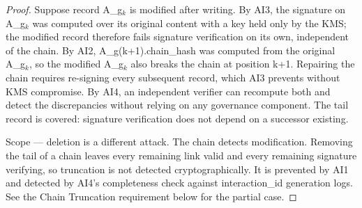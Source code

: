 \begin{proof}
Suppose record A\_\allowbreak{}g$_k$ is modified after writing.
By AI3, the signature on A\_\allowbreak{}g$_k$ was computed over its original content with a key held only by the KMS; the modified record therefore fails signature verification on its own, independent of the chain.
By AI2, A\_\allowbreak{}g(k+1).chain\_\allowbreak{}hash was computed from the original A\_\allowbreak{}g$_k$, so the modified A\_\allowbreak{}g$_k$ also breaks the chain at position k+1. Repairing the chain requires re-signing every subsequent record, which AI3 prevents without KMS compromise.
By AI4, an independent verifier can recompute both and detect the discrepancies without relying on any governance component.
The tail record is covered: signature verification does not depend on a successor existing.

Scope --- deletion is a different attack. The chain detects modification.
Removing the tail of a chain leaves every remaining link valid and every remaining signature verifying, so truncation is not detected cryptographically. It is prevented by AI1 and detected by AI4's completeness check against interaction\_\allowbreak{}id generation logs. See the Chain Truncation requirement below for the partial case.

\end{proof}



